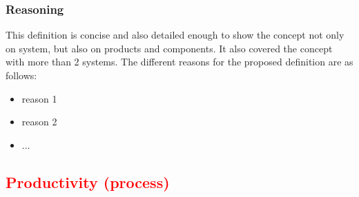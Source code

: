 \documentclass[letterpaper, cleveref]{lipics-v2019}
\newcommand{\authornote}[3]{\textcolor{#1}{[#3 ---#2]}}
\newcommand{\authornote}[3]{}
\newcommand{\ad}[1]{\authornote{cyan}{AD}{#1}} %
\newcommand{\notdone}[1]{\textcolor{red}{#1}}
\theoremstyle{definition}
\begin{document}
\subsubsection*{Reasoning}

This definition is concise and also detailed enough to show the concept not only
on system, but also on products and components. It also covered the concept with
more than 2 systems.  The different reasons for the proposed definition are as
follows:

\begin{itemize}
  \item reason 1
  \item reason 2
  \item ...
\end{itemize}


\subsection{\notdone{Productivity (process)}} %
\end{document}
